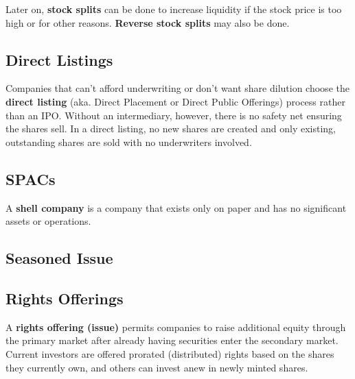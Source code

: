 \documentclass{article}
\begin{document}
    \begin{definition}
      Later on, \textbf{stock splits} can be done to increase liquidity if the stock price is too high or for other reasons. \textbf{Reverse stock splits} may also be done. 
    \end{definition}

  \subsection{Direct Listings}

    \begin{definition}
      Companies that can't afford underwriting or don't want share dilution choose the \textbf{direct listing} (aka. Direct Placement or Direct Public Offerings) process rather than an IPO. Without an intermediary, however, there is no safety net ensuring the shares sell. In a direct listing, no new shares are created and only existing, outstanding shares are sold with no underwriters involved. 
    \end{definition}

  \subsection{SPACs}

    \begin{definition}
      A \textbf{shell company} is a company that exists only on paper and has no significant assets or operations. 
    \end{definition}

  \subsection{Seasoned Issue}

  \subsection{Rights Offerings}

    \begin{definition}
      A \textbf{rights offering (issue)} permits companies to raise additional equity through the primary market after already having securities enter the secondary market. Current investors are offered prorated (distributed) rights based on the shares they currently own, and others can invest anew in newly minted shares.
    \end{definition}
\end{document}
